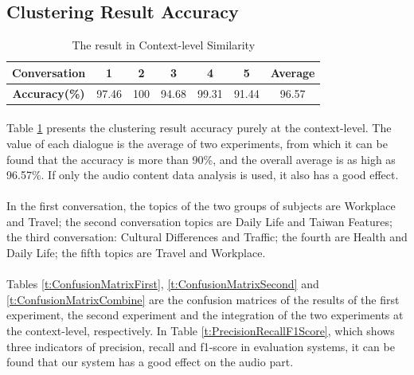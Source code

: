 \documentclass[a4paper,12pt]{report}
\begin{document}
\subsection{Clustering Result Accuracy}
\begin{table}[btph]
\begin{center}
\caption{The result in Context-level Similarity}
\label{t:Result_Context_Similarity}
\begin{tabular}{|c|c|c|c|c|c|c|}
\hline
\textbf{Conversation} & 1     & 2  & 3   & 4  & 5  & Average \\ \hline
\textbf{Accuracy(\%)} & 97.46 & 100 & 94.68 & 99.31 & 91.44 & 96.57      \\ \hline
\end{tabular}

\end{center}
\end{table}

\paragraph{}
Table \ref{t:Result_Context_Similarity} presents the clustering result accuracy purely at the context-level. The value of each dialogue is the average of two experiments, from which it can be found that the accuracy is more than 90\%, and the overall average is as high as 96.57\%. If only the audio content data analysis is used, it also has a good effect.
\clearpage
\paragraph{}
In the first conversation, the topics of the two groups of subjects are Workplace and Travel; the second conversation topics are Daily Life and Taiwan Features; the third conversation: Cultural Differences and Traffic; the fourth are Health and Daily Life; the fifth topics are Travel and Workplace.
\paragraph{}
Tables \ref{t:ConfusionMatrixFirst}, \ref{t:ConfusionMatrixSecond} and \ref{t:ConfusionMatrixCombine} are the confusion matrices of the results of the first experiment, the second experiment and the integration of the two experiments at the context-level, respectively. In Table \ref{t:PrecisionRecallF1Score}, which shows three indicators of precision, recall and f1-score in evaluation systems, it can be found that our system has a good effect on the audio part.
\end{document}
